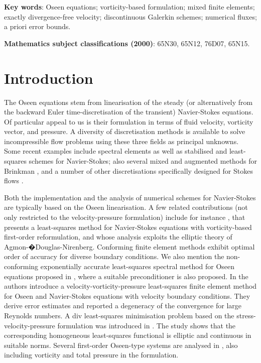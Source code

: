 \documentclass[reqno,a4paper]{article}
\numberwithin{equation}{section}
\begin{document}
\noindent
{\bf Key words}: Oseen equations; vorticity-based formulation; mixed finite elements; exactly divergence-free velocity; discontinuous Galerkin schemes; numerical fluxes; a priori error bounds.

\smallskip\noindent
{\bf Mathematics subject classifications (2000)}:  65N30, 65N12, 76D07, 65N15. 


\maketitle
\section{Introduction}
The Oseen equations  
stem from linearisation of the steady (or alternatively from the backward Euler time-discretisation 
of the transient) Navier-Stokes equations. Of particular appeal to us is their formulation in terms of 
fluid velocity, vorticity vector, and pressure. A diversity of discretisation methods is available to solve 
incompressible flow problems using these three fields as principal unknowns. Some recent examples 
include spectral elements \cite{amoura07,azaiez06} as well as stabilised and least-squares 
schemes \cite{amara07,bochev97} for Navier-Stokes; also several mixed and augmented methods for 
Brinkman  \cite{AGMRb15,anaya15a,anaya17b}, and a number of other discretisations 
specifically designed for Stokes 
flows \cite{anaya13,duan03,dubois03,gatica11,salaun15}. 

Both the implementation and the analysis of numerical schemes for 
Navier-Stokes are typically based on 
the Oseen linearisation. A few related contributions  (not only restricted to the velocity-pressure 
formulation) include for instance
\cite{bochev99}, that presents 
a least-squares  method 
for Navier-Stokes equations with vorticity-based first-order reformulation, and whose 
analysis exploits  
the elliptic theory of Agmon-�Douglas-Nirenberg. 
Conforming finite element methods exhibit optimal order of accuracy for 
diverse boundary conditions. We also mention the 
non-conforming exponentially
accurate least-squares spectral  method for Oseen
equations  proposed in \cite{mohapatra16}, where 
a suitable preconditioner is also proposed. 
In \cite{tsai05} the authors introduce a velocity-vorticity-pressure 
least-squares  finite element method for Oseen and Navier-Stokes equations with velocity
boundary conditions. They derive error estimates and reported a degeneracy of 
the convergence for large Reynolds numbers. A div least-squares
minimisation problem based on the stress-velocity-pressure formulation was 
introduced in \cite{cai16}. The study shows 
that the corresponding homogeneous least-squares functional is elliptic and 
continuous in suitable norms. Several first-order 
Oseen-type systems are analysed in \cite{chang07}, also including vorticity and total pressure in the formulation.
\end{document}

